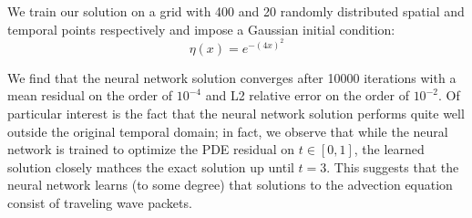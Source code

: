 \documentclass[letterpaper,12pt]{article}
\begin{document}
    We train our solution on a grid with 400 and 20 randomly distributed spatial and temporal points respectively and
    impose a Gaussian initial condition:
    $$
    \eta(x) = e^{-(4x)^2}
    $$
    
    We find that the neural network solution converges after 10000 iterations with a mean residual on the order of 
    $10^{-4}$ and L2 relative error on the order of $10^{-2}$. Of particular interest is the fact that the neural 
    network solution performs quite well outside the original temporal domain; in fact, we observe that while the neural
    network is trained to optimize the PDE residual on $t \in [0, 1]$, the learned solution closely mathces the exact 
    solution up until $t=3$. This suggests that the neural network learns (to some degree) that solutions to the 
    advection equation consist of traveling wave packets.
\end{document}
